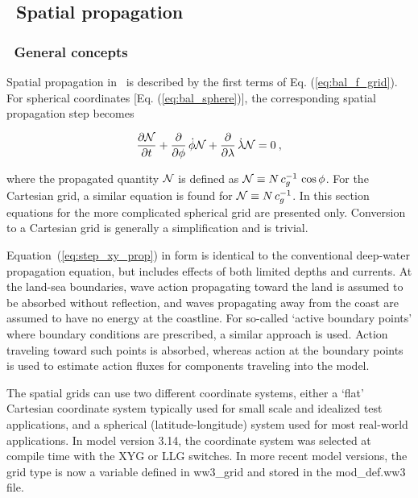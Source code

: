 \vssub
\subsection{~Spatial propagation} \label{sub:xy_prop}
\vssub
\subsubsection{~General concepts}
\vsssub

Spatial propagation in \ws\ is described by the first terms of
Eq. (\ref{eq:bal_f_grid}). For spherical coordinates
[Eq. (\ref{eq:bal_sphere})], the corresponding spatial propagation step
becomes


\begin{equation}
\frac{\p \cN}{\p t} + \frac{\p}{\p \phi} \, \dot{\phi} \cN +
\frac{\p}{\p \lambda} \, \dot{\lambda} \cN = 0
\: , \label{eq:step_xy_prop} 
\end{equation}

\noindent 
where the propagated quantity ${\cal N}$ is defined as ${\cal N} \equiv N \, c_g^{-1} \,
\cos\phi$. For the Cartesian grid, a similar equation is found for
${\cal N} \equiv N \, c_g^{-1}$. In this section equations for the more complicated
spherical grid are presented only. Conversion to a Cartesian grid is generally
a simplification and is trivial.

Equation~(\ref{eq:step_xy_prop}) in form is identical to the conventional
deep-water propagation equation, but includes effects of both limited depths
and currents. At the land-sea boundaries, wave action propagating toward the
land is assumed to be absorbed without reflection, and waves propagating away
from the coast are assumed to have no energy at the coastline. For so-called
`active boundary points' where boundary conditions are prescribed, a similar
approach is used. Action traveling toward such points is absorbed, whereas
action at the boundary points is used to estimate action fluxes for components
traveling into the model.

The spatial grids can use two different coordinate systems, either a `flat'
Cartesian coordinate system typically used for small scale and idealized test
applications, and a spherical (latitude-longitude) system used for most
real-world applications. In model version 3.14, the coordinate system was
selected at compile time with the {\code XYG} or {\code LLG} switches. In more
recent model versions, the grid type is now a variable defined in {\file
ww3\_grid} and stored in the {\file mod\_def.ww3} file. 

